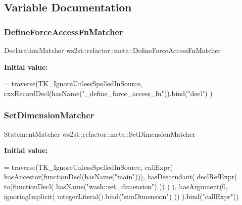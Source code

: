 \subsection{Variable Documentation}
\mbox{\label{namespacews2st_1_1refactor_1_1meta_a341e8a9e350c69aae8ce4e616345c9a6}} 
\subsubsection{\texorpdfstring{Define\+Force\+Access\+Fn\+Matcher}{DefineForceAccessFnMatcher}}
{\footnotesize\ttfamily Declaration\+Matcher ws2st\+::refactor\+::meta\+::\+Define\+Force\+Access\+Fn\+Matcher}

{\bfseries Initial value\+:}
\begin{DoxyCode}
= traverse(TK\_IgnoreUnlessSpelledInSource, 
        cxxRecordDecl(hasName(\textcolor{stringliteral}{"\_define\_force\_access\_fn"})).bind(\textcolor{stringliteral}{"decl"})
    )
\end{DoxyCode}
\mbox{\label{namespacews2st_1_1refactor_1_1meta_abb0b59f78b21df355ad41833e9043648}} 
\subsubsection{\texorpdfstring{Set\+Dimension\+Matcher}{SetDimensionMatcher}}
{\footnotesize\ttfamily Statement\+Matcher ws2st\+::refactor\+::meta\+::\+Set\+Dimension\+Matcher}

{\bfseries Initial value\+:}
\begin{DoxyCode}
= traverse(TK\_IgnoreUnlessSpelledInSource, callExpr(
        hasAncestor(functionDecl(hasName(\textcolor{stringliteral}{"main"}))),
        hasDescendant(
            declRefExpr(
                to(functionDecl(
                    hasName(\textcolor{stringliteral}{"wash::set\_dimension"})
                ))
            )
        ),
        hasArgument(0, ignoringImplicit( integerLiteral().bind(\textcolor{stringliteral}{"simDimension"}) ))
    ).bind(\textcolor{stringliteral}{"callExpr"}))
\end{DoxyCode}
\mbox{\label{namespacews2st_1_1refactor_1_1meta_a1d7378d88c577045f1b492e33a42ec13}} 
